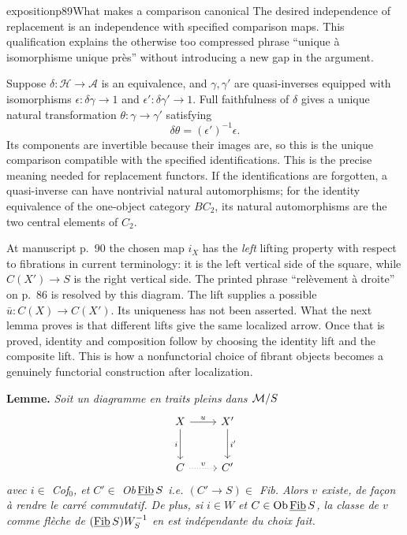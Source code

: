\begin{dcomment}{exposition}{p89}{What makes a comparison canonical}
The desired independence of replacement is an independence with specified comparison maps. This qualification explains the otherwise too compressed phrase ``unique \`a isomorphisme unique pr\`es'' without introducing a new gap in the argument.

Suppose $\delta:\mathcal H\to\mathcal A$ is an equivalence, and $\gamma,\gamma'$ are quasi-inverses equipped with isomorphisms $\epsilon:\delta\gamma\to1$ and $\epsilon':\delta\gamma'\to1$. Full faithfulness of $\delta$ gives a unique natural transformation $\theta:\gamma\to\gamma'$ satisfying
\[
 \delta\theta=(\epsilon')^{-1}\epsilon.
\]
Its components are invertible because their images are, so this is the unique comparison compatible with the specified identifications. This is the precise meaning needed for replacement functors. If the identifications are forgotten, a quasi-inverse can have nontrivial natural automorphisms; for the identity equivalence of the one-object category $BC_2$, its natural automorphisms are the two central elements of $C_2$.

At manuscript p.~90 the chosen map $i_X$ has the \emph{left} lifting property with respect to fibrations in current terminology: it is the left vertical side of the square, while $C(X')\to S$ is the right vertical side. The printed phrase ``rel\`evement \`a droite'' on p.~86 is resolved by this diagram. The lift supplies a possible $\bar u:C(X)\to C(X')$. Its uniqueness has not been asserted. What the next lemma proves is that different lifts give the same localized arrow. Once that is proved, identity and composition follow by choosing the identity lift and the composite lift. This is how a nonfunctorial choice of fibrant objects becomes a genuinely functorial construction after localization.
\end{dcomment}


\textbf{Lemme.} \textit{Soit un diagramme en traits pleins dans $\mathcal{M}/S$}
\[
\begin{tikzcd}[row sep=large]
X \arrow[r, "u"] \arrow[d, "i"'] & X' \arrow[d, "i'"] \\
C \arrow[r, dotted, "v"] & C'
\end{tikzcd}
\]
\textit{avec $i\in$ Cof$_0$, et $C'\in$ Ob$\,\underline{\mathrm{Fib}}\, S$ i.e. $(C'\longrightarrow S)\in$ Fib. Alors $v$ existe, de façon à rendre
le carré commutatif. De plus, si $i\in W$ et $C\in\mathrm{Ob}\,\underline{\mathrm{Fib}}\, S$, la classe de $v$ comme flèche de
$(\underline{\mathrm{Fib}}\, S)W_S^{-1}$ en est indépendante du choix fait.}

